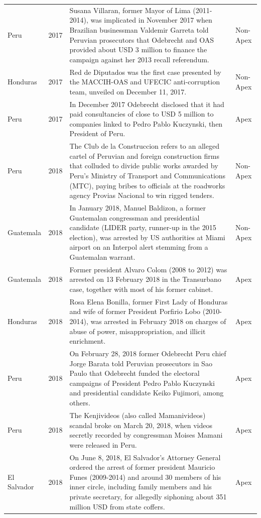 \begin{landscape}
\begin{longtable}{@{}l c p{15.5cm} l@{}}
Peru & 2017 & Susana Villaran, former Mayor of Lima (2011-2014), was implicated in November 2017 when Brazilian businessman Valdemir Garreta told Peruvian prosecutors that Odebrecht and OAS provided about USD 3 million to finance the campaign against her 2013 recall referendum. & Non-Apex \\
Honduras & 2017 & Red de Diputados was the first case presented by the MACCIH-OAS and UFECIC anti-corruption team, unveiled on December 11, 2017. & Non-Apex \\
Peru & 2017 & In December 2017 Odebrecht disclosed that it had paid consultancies of close to USD 5 million to companies linked to Pedro Pablo Kuczynski, then President of Peru. & Apex \\
Peru & 2018 & The Club de la Construccion refers to an alleged cartel of Peruvian and foreign construction firms that colluded to divide public works awarded by Peru's Ministry of Transport and Communications (MTC), paying bribes to officials at the roadworks agency Provias Nacional to win rigged tenders. & Non-Apex \\
Guatemala & 2018 & In January 2018, Manuel Baldizon, a former Guatemalan congressman and presidential candidate (LIDER party, runner-up in the 2015 election), was arrested by US authorities at Miami airport on an Interpol alert stemming from a Guatemalan warrant. & Non-Apex \\
Guatemala & 2018 & Former president Alvaro Colom (2008 to 2012) was arrested on 13 February 2018 in the Transurbano case, together with most of his former cabinet. & Apex \\
Honduras & 2018 & Rosa Elena Bonilla, former First Lady of Honduras and wife of former President Porfirio Lobo (2010-2014), was arrested in February 2018 on charges of abuse of power, misappropriation, and illicit enrichment. & Apex \\
Peru & 2018 & On February 28, 2018 former Odebrecht Peru chief Jorge Barata told Peruvian prosecutors in Sao Paulo that Odebrecht funded the electoral campaigns of President Pedro Pablo Kuczynski and presidential candidate Keiko Fujimori, among others. & Apex \\
Peru & 2018 & The Kenjivideos (also called Mamanivideos) scandal broke on March 20, 2018, when videos secretly recorded by congressman Moises Mamani were released in Peru. & Apex \\
El Salvador & 2018 & On June 8, 2018, El Salvador's Attorney General ordered the arrest of former president Mauricio Funes (2009-2014) and around 30 members of his inner circle, including family members and his private secretary, for allegedly siphoning about 351 million USD from state coffers. & Apex \\

\end{longtable}
\end{landscape}
